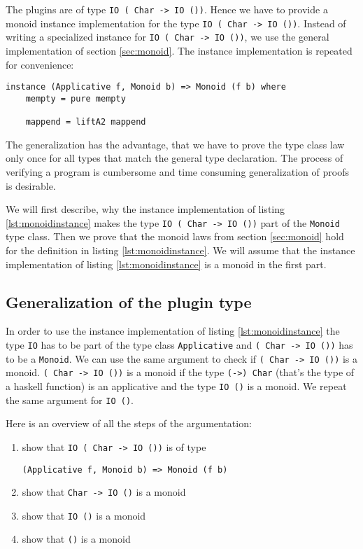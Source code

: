 The plugins are of type \verb|IO ( Char -> IO ())|. Hence we have to provide a monoid instance implementation for the type \verb|IO ( Char -> IO ())|. Instead of writing a specialized instance for \verb|IO ( Char -> IO ())|, we use the general implementation of section \ref{sec:monoid}.
The instance implementation is repeated for convenience:

\begin{lstlisting}[caption={Monoid instance},label={lst:monoidinstance}]
instance (Applicative f, Monoid b) => Monoid (f b) where
    mempty = pure mempty

    mappend = liftA2 mappend
\end{lstlisting}
The generalization has the advantage, that we have to prove the type class law only once for all types that match the general type declaration. The process of verifying a program is cumbersome and time consuming generalization of proofs is desirable.

We will first describe, why the instance implementation of listing \ref{lst:monoidinstance} makes the type \verb|IO ( Char -> IO ())| part of the \verb|Monoid| type class. Then we prove that the monoid laws from section \ref{sec:monoid} hold for the definition in listing \ref{lst:monoidinstance}. We will assume that the instance implementation of listing \ref{lst:monoidinstance} is a monoid in the first part.

\subsection{Generalization of the plugin type }
\label{sec:generalization}

In order to use the instance implementation of listing \ref{lst:monoidinstance} the type \verb|IO| has to be part of the type class \verb|Applicative| and \verb|( Char -> IO ())| has to be a \verb|Monoid|. We can use the same argument to check if \verb|( Char -> IO ())|  is a monoid. \verb|( Char -> IO ())| is a monoid if the type \verb|(->) Char| (that's the type of a haskell function) is an applicative and the type \verb|IO ()| is a monoid. We repeat the same argument for \verb|IO ()|.

Here is an overview of all the steps of the argumentation:
\begin{enumerate}
\item show that  \verb|IO ( Char -> IO ())| is of type 
\begin{verbatim}
(Applicative f, Monoid b) => Monoid (f b)
\end{verbatim}
\item show that \verb|Char -> IO ()| is a monoid
\item show that \verb|IO ()| is a monoid
\item show that \verb|()| is a monoid
\end{enumerate}

